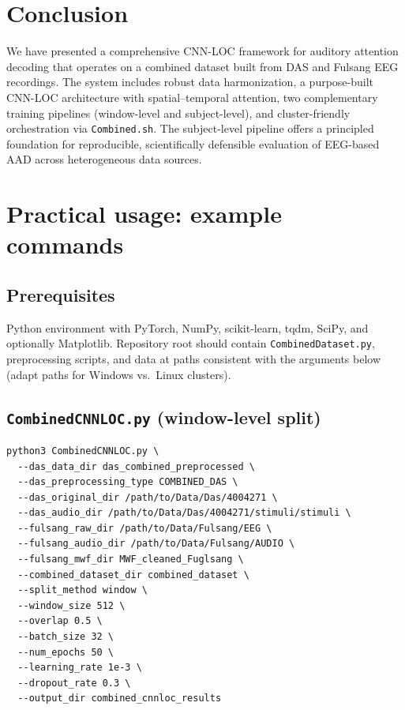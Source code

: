 \documentclass[11pt,a4paper]{article}
\newcommand{\py}[1]{\texttt{#1}}
\begin{document}
\section{Conclusion}
\label{sec:conclusion}

We have presented a comprehensive CNN-LOC framework for auditory attention decoding that operates on a combined dataset built from DAS and Fulsang EEG recordings. The system includes robust data harmonization, a purpose-built CNN-LOC architecture with spatial--temporal attention, two complementary training pipelines (window-level and subject-level), and cluster-friendly orchestration via \py{Combined.sh}. The subject-level pipeline offers a principled foundation for reproducible, scientifically defensible evaluation of EEG-based AAD across heterogeneous data sources.

\appendix
\section{Practical usage: example commands}
\label{app:commands}

\subsection{Prerequisites}

Python environment with PyTorch, NumPy, scikit-learn, tqdm, SciPy, and optionally Matplotlib. Repository root should contain \py{CombinedDataset.py}, preprocessing scripts, and data at paths consistent with the arguments below (adapt paths for Windows vs.\ Linux clusters).

\subsection{\py{CombinedCNNLOC.py} (window-level split)}

\begin{verbatim}
python3 CombinedCNNLOC.py \
  --das_data_dir das_combined_preprocessed \
  --das_preprocessing_type COMBINED_DAS \
  --das_original_dir /path/to/Data/Das/4004271 \
  --das_audio_dir /path/to/Data/Das/4004271/stimuli/stimuli \
  --fulsang_raw_dir /path/to/Data/Fulsang/EEG \
  --fulsang_audio_dir /path/to/Data/Fulsang/AUDIO \
  --fulsang_mwf_dir MWF_cleaned_Fuglsang \
  --combined_dataset_dir combined_dataset \
  --split_method window \
  --window_size 512 \
  --overlap 0.5 \
  --batch_size 32 \
  --num_epochs 50 \
  --learning_rate 1e-3 \
  --dropout_rate 0.3 \
  --output_dir combined_cnnloc_results
\end{verbatim}
\end{document}
